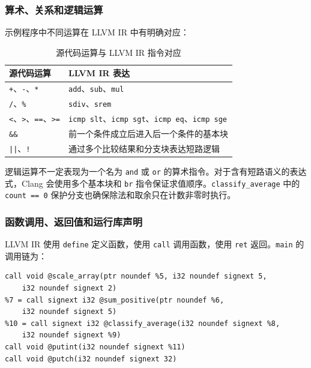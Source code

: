 \documentclass[a4paper]{article}
\begin{document}
\subsubsection{算术、关系和逻辑运算}

示例程序中不同运算在 LLVM IR 中有明确对应：

\begin{table}[H]
  \centering
  \caption{源代码运算与 LLVM IR 指令对应}
  \label{tab:ops}
  \begin{tabular}{p{}p{}}
    \toprule
    源代码运算 & LLVM IR 表达 \\
    \midrule
    \texttt{+}、\texttt{-}、\texttt{*} & \texttt{add}、\texttt{sub}、\texttt{mul} \\
    \texttt{/}、\texttt{\%} & \texttt{sdiv}、\texttt{srem} \\
    \texttt{<}、\texttt{>}、\texttt{==}、\texttt{>=} & \texttt{icmp slt}、\texttt{icmp sgt}、\texttt{icmp eq}、\texttt{icmp sge} \\
    \texttt{\&\&} & 前一个条件成立后进入后一个条件的基本块 \\
    \texttt{||}、\texttt{!} & 通过多个比较结果和分支块表达短路逻辑 \\
    \bottomrule
  \end{tabular}
\end{table}

逻辑运算不一定表现为一个名为 \texttt{and} 或 \texttt{or} 的算术指令。对于含有短路语义的表达式，Clang 会使用多个基本块和 \texttt{br} 指令保证求值顺序。\texttt{classify\_average} 中的 \texttt{count == 0} 保护分支也确保除法和取余只在计数非零时执行。

\subsubsection{函数调用、返回值和运行库声明}

LLVM IR 使用 \texttt{define} 定义函数，使用 \texttt{call} 调用函数，使用 \texttt{ret} 返回。\texttt{main} 的调用链为：

\begin{lstlisting}[language=LLVMIR,caption={main 中的函数调用和运行库调用}]
call void @scale_array(ptr noundef %5, i32 noundef signext 5,
    i32 noundef signext 2)
%7 = call signext i32 @sum_positive(ptr noundef %6,
    i32 noundef signext 5)
%10 = call signext i32 @classify_average(i32 noundef signext %8,
    i32 noundef signext %9)
call void @putint(i32 noundef signext %11)
call void @putch(i32 noundef signext 32)
\end{lstlisting}
\end{document}
